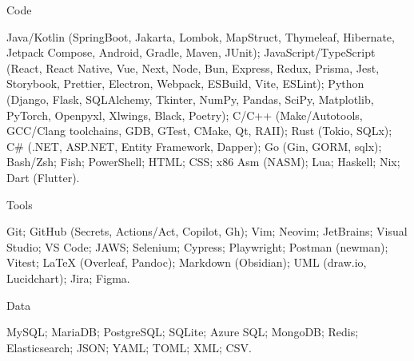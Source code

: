 \documentclass[10pt, a4paper]{russell}
\begin{document}
\makecvheader
\makecvfooter{\today}{}{\thepage}

\begin{cvskills}

    \cvskill
        {Code}
        {\parbox[t]{0.99\linewidth}{
            Java/Kotlin (SpringBoot, Jakarta, Lombok, MapStruct, Thymeleaf, Hibernate, Jetpack Compose, Android, Gradle, Maven, JUnit); 
            JavaScript/TypeScript (React, React Native, Vue, Next, Node, Bun, Express, Redux, Prisma, Jest, Storybook, Prettier, Electron, Webpack, ESBuild, Vite, ESLint); 
            Python (Django, Flask, SQLAlchemy, Tkinter, NumPy, Pandas, SciPy, Matplotlib, PyTorch, Openpyxl, Xlwings, Black, Poetry);
            C/C++ (Make/Autotools, GCC/Clang toolchains, GDB, GTest, CMake, Qt, RAII);
            Rust (Tokio, SQLx);
            C\# (.NET, ASP.NET, Entity Framework, Dapper); 
            Go (Gin, GORM, sqlx);
            Bash/Zsh;
            Fish;
            PowerShell;
            HTML;
            CSS;
            x86 Asm (NASM);
            Lua;
            Haskell;
            Nix;
            Dart (Flutter).
        }}

    \cvskill
        {Tools}
        {\parbox[t]{0.99\linewidth}{
            Git;  
            GitHub (Secrets, Actions/Act, Copilot, Gh);  
            Vim;  
            Neovim;  
            JetBrains;  
            Visual Studio;  
            VS Code;  
            JAWS;  
            Selenium;  
            Cypress;  
            Playwright;  
            Postman (newman);  
            Vitest;    
            LaTeX (Overleaf, Pandoc);  
            Markdown (Obsidian);  
            UML (draw.io, Lucidchart);  
            Jira;  
            Figma.
        }}

    \cvskill
        {Data}
        {\parbox[t]{0.99\linewidth}{
            MySQL;
            MariaDB;  
            PostgreSQL;  
            SQLite;  
            Azure SQL;
            MongoDB;  
            Redis;
            Elasticsearch;
            JSON;  
            YAML;  
            TOML;  
            XML;  
            CSV.
        }}


\end{cvskills}
\end{document}
